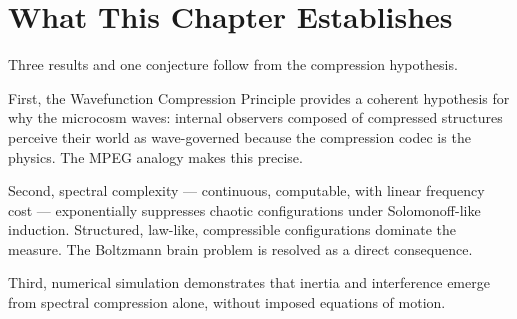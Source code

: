 \section{What This Chapter Establishes}

Three results and one conjecture follow from the compression hypothesis.

First, the Wavefunction Compression Principle provides a coherent
hypothesis for why the microcosm waves: internal observers composed of
compressed structures perceive their world as wave-governed because the
compression codec is the physics. The MPEG analogy makes this precise.

Second, spectral complexity --- continuous, computable, with linear
frequency cost --- exponentially suppresses chaotic configurations under
Solomonoff-like induction. Structured, law-like, compressible
configurations dominate the measure. The Boltzmann brain problem is
resolved as a direct consequence.

Third, numerical simulation demonstrates that inertia and interference
emerge from spectral compression alone, without imposed equations of
motion.

